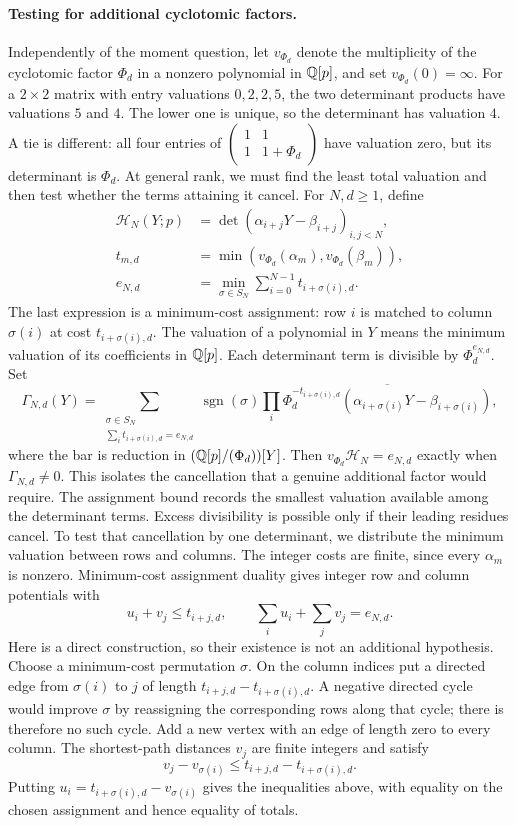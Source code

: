 \documentclass[11pt]{article}
\begin{document}
\paragraph{Testing for additional cyclotomic factors.}
Independently of the moment question, let $v_{\Phi_d}$ denote the
multiplicity of the cyclotomic factor $\Phi_d$ in a nonzero polynomial
in $\mathbb{Q}[p]$, and set $v_{\Phi_d}(0)=\infty$.
For a $2\times2$ matrix with entry valuations $0,2,2,5$, the two
determinant products have valuations $5$ and $4$. The lower one is
unique, so the determinant has valuation $4$. A tie is different:
all four entries of
$\left(\begin{smallmatrix}1&1\\1&1+\Phi_d\end{smallmatrix}\right)$
have valuation zero, but its determinant is $\Phi_d$.
At general rank, we must find the least total valuation and then test
whether the terms attaining it cancel. For $N,d\ge1$, define
\[
 \begin{aligned}
 \mathcal H_N(Y;p)&=\det(\alpha_{i+j}Y-\beta_{i+j})_{i,j<N},\\
 t_{m,d}&=\min(v_{\Phi_d}(\alpha_m),v_{\Phi_d}(\beta_m)),\\
 e_{N,d}&=\min_{\sigma\in S_N}\sum_{i=0}^{N-1}t_{i+\sigma(i),d}.
 \end{aligned}
\]
The last expression is a minimum-cost assignment: row $i$ is matched
to column $\sigma(i)$ at cost $t_{i+\sigma(i),d}$.
The valuation of a polynomial in $Y$ means the minimum valuation of
its coefficients in $\mathbb{Q}[p]$. Each determinant term is
divisible by $\Phi_d^{e_{N,d}}$. Set
\[
 \Gamma_{N,d}(Y)=
 \sum_{\substack{\sigma\in S_N\\\sum_i t_{i+\sigma(i),d}=e_{N,d}}}
 \operatorname{sgn}(\sigma)
 \prod_i\overline{\Phi_d^{-t_{i+\sigma(i),d}}
        (\alpha_{i+\sigma(i)}Y-\beta_{i+\sigma(i)})},
\]
where the bar is reduction in $(\mathbb{Q}[p]/(\Phi_d))[Y]$.
Then $v_{\Phi_d}\mathcal H_N=e_{N,d}$ exactly when
$\Gamma_{N,d}\ne0$. This isolates the cancellation that a genuine
additional factor would require.
The assignment bound records the smallest valuation available among
the determinant terms. Excess divisibility is possible only if their
leading residues cancel. To test that cancellation by one determinant,
we distribute the minimum valuation between rows and columns.
The integer costs are finite, since every $\alpha_m$ is nonzero. Minimum-cost assignment duality gives
integer row and column potentials with
\[
 u_i+v_j\le t_{i+j,d},\qquad
 \sum_i u_i+\sum_jv_j=e_{N,d}.
\]
Here is a direct construction, so their existence is not an additional
hypothesis. Choose a minimum-cost permutation $\sigma$. On the column
indices put a directed edge from $\sigma(i)$ to $j$ of length
$t_{i+j,d}-t_{i+\sigma(i),d}$. A negative directed cycle would improve
$\sigma$ by reassigning the corresponding rows along that cycle;
there is therefore no such cycle. Add a new vertex with an edge of
length zero to every column. The shortest-path distances $v_j$ are
finite integers and satisfy
\[
 v_j-v_{\sigma(i)}\le t_{i+j,d}-t_{i+\sigma(i),d}.
\]
Putting $u_i=t_{i+\sigma(i),d}-v_{\sigma(i)}$ gives the inequalities
above, with equality on the chosen assignment and hence equality of
totals.
\end{document}
